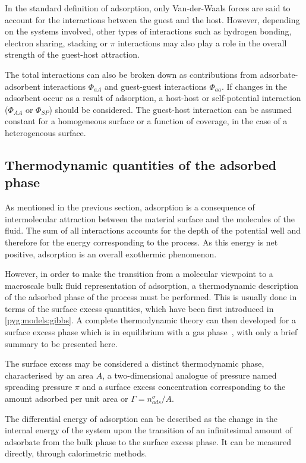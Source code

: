 In the standard definition of adsorption, only
Van-der-Waals forces are said to account for the interactions between
the guest and the host. However, depending on the
systems involved, other types of interactions such
as hydrogen bonding, electron sharing, stacking or \( \pi \) interactions
may also play a role in the overall strength of the guest-host
attraction.

The total interactions can also be broken down as contributions
from adsorbate-adsorbent interactions \(\Phi_{aA}\) and 
guest-guest interactions \(\Phi_{aa}\).
If changes in the adsorbent occur as a result of adsorption,
a host-host or self-potential interaction (\(\Phi_{AA}\) or 
\(\Phi_{SP}\)) should be considered.
The guest-host interaction can be assumed constant for a homogeneous
surface or a function of coverage, in the case of a
heterogeneous surface.

\subsection{Thermodynamic quantities of the adsorbed phase}

As mentioned in the previous section, adsorption
is a consequence of intermolecular attraction between the
material surface and the molecules of the fluid. The sum of
all interactions accounts for the depth of the potential
well and therefore for the energy corresponding to the
process. As this energy is net positive, adsorption is an
overall exothermic phenomenon.

However, in order to make the transition from a molecular
viewpoint to a macroscale bulk fluid representation of
adsorption, a thermodynamic description of the adsorbed
phase of the process must be performed. This is usually 
done in terms of the surface excess quantities, which 
have been first introduced in \autoref{pyg:models:gibbs}.
A complete thermodynamic theory can then developed for a surface 
excess phase which is in equilibrium with a gas 
phase~\cite{rouquerolAdsorptionPowdersPorous2013}, with only
a brief summary to be presented here.

The surface excess may be considered a distinct thermodynamic phase, 
characterised by an area \(A\), a two-dimensional analogue of 
pressure named spreading pressure \(\pi\) and a surface excess 
concentration corresponding to the amount adsorbed per unit
area or \(\Gamma = n_{ads}^{\sigma}/A\).

The differential energy of adsorption can be described as the 
change in the internal energy of the system upon the transition
of an infinitesimal amount of adsorbate from the bulk phase
to the surface excess phase. It can be measured directly, through
calorimetric methods.

